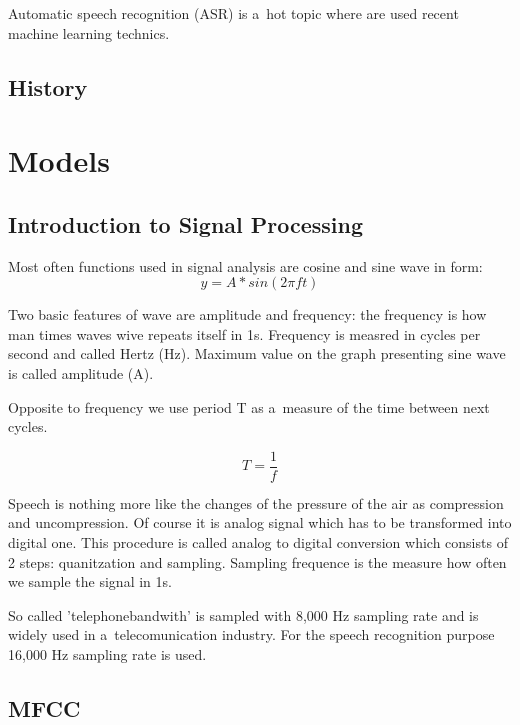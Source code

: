\documentclass[a4paper]{report}
\theoremstyle{definition}
\begin{document}
Automatic speech recognition (ASR) is a~hot topic where are used recent machine learning technics.

\section{History}

\chapter{Models}

\section{Introduction to Signal Processing}

Most often functions used in signal analysis are cosine and sine wave in form:
\begin{equation}
	y = A*sin(2\pi ft)
	\label{Sinus form}
\end{equation}

Two basic features of wave are amplitude and frequency:
the frequency is how man times waves wive repeats itself in 1s. Frequency is measred in cycles per second and called Hertz (Hz). Maximum value on the graph presenting sine wave is called amplitude (A).

Opposite to frequency we use period T as a~measure of the time between next cycles.


\begin{equation}
	T = \frac{1}{f}
	\label{Definition of period}
\end{equation}

Speech is nothing more like the changes of the pressure of the air as compression and uncompression. Of course it is analog signal which has to be transformed into digital one. This procedure is called analog to digital conversion which consists of 2 steps: quanitzation and sampling. Sampling frequence is the measure how often we sample the signal in 1s. 


So called 'telephone\dywiz bandwith' is sampled with 8,000 Hz sampling rate and is widely used in a~telecomunication industry. For the speech recognition purpose 16,000 Hz sampling rate is used.  






\section{MFCC}
\end{document}
